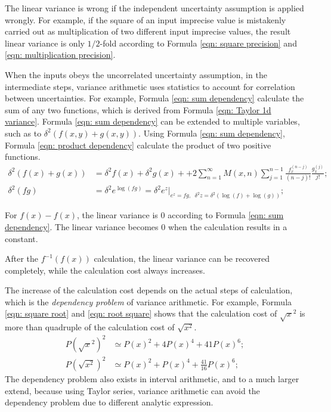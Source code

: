 \documentclass[twoside]{article}
\numberwithin{equation}{section}
\begin{document}
The linear variance is wrong if the independent uncertainty assumption is applied wrongly.
For example, if the square of an input imprecise value is mistakenly carried out as multiplication of two different input imprecise values, the result linear variance is only $1/2$-fold according to Formula \eqref{eqn: square precision} and \eqref{eqn: multiplication precision}.

When the inputs obeys the uncorrelated uncertainty assumption, in the intermediate steps, variance arithmetic uses statistics to account for correlation between uncertainties.
For example, Formula \eqref{eqn: sum dependency} calculate the sum of any two functions, which is derived from Formula \eqref{eqn: Taylor 1d variance}.
Formula \eqref{eqn: sum dependency} can be extended to multiple variables, such as to $\delta^2 (f(x, y) + g(x, y))$.
Using Formula \eqref{eqn: sum dependency}, Formula \eqref{eqn: product dependency}  calculate the product of two positive functions.
\begin{align}
\label{eqn: sum dependency}
\delta^2 (f(x) + g(x)) &= \delta^2 f(x) + \delta^2 g(x) + 
  + 2 \sum_{n=1}^{\infty} M(x,n) \sum_{j=1}^{n-1} \frac{f^{(n-j)}_x }{(n-j)!} \frac{g^{(j)}_x}{j!}; \\
\label{eqn: product dependency}
\delta^2 (fg) &= \delta^2 e^{\log(fg)} = \delta^2 e^z |_{e^z = fg,\;\; \delta^2 z = \delta^2 (\log(f) + \log(g))};
\end{align}

For $f(x) - f(x)$, the linear variance is $0$ according to Formula \eqref{eqn: sum dependency}.
The linear variance becomes $0$ when the calculation results in a constant.

After the $f^{-1}(f(x))$ calculation, the linear variance can be recovered completely, while the calculation cost always increases.

The increase of the calculation cost depends on the actual steps of calculation, which is the \emph{dependency problem} of variance arithmetic.
For example, Formula \eqref{eqn: square root} and \eqref{eqn: root square} shows that the calculation cost of $\sqrt{x}^2$ is more than quadruple of the calculation cost of $\sqrt{x^2}$.
\begin{align}
\label{eqn: square root}
P(\sqrt{x}^2)^2 &\simeq P(x)^2 + 4 P(x)^4 + 41 P(x)^6; \\
\label{eqn: root square}
P(\sqrt{x^2})^2 &\simeq P(x)^2 + P(x)^4 + \frac{41}{16} P(x)^6;
\end{align}
The dependency problem also exists in interval arithmetic, and to a much larger extend, because using Taylor series, variance arithmetic can avoid the dependency problem due to different analytic expression.
\end{document}

